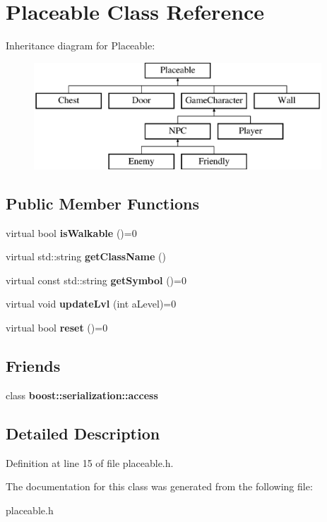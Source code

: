 \hypertarget{class_placeable}{}\section{Placeable Class Reference}
\label{class_placeable}
Inheritance diagram for Placeable\+:\begin{figure}[H]
\begin{center}
\leavevmode
\includegraphics[height=4.000000cm]{class_placeable}
\end{center}
\end{figure}
\subsection*{Public Member Functions}
\begin{DoxyCompactItemize}
\item 
\hypertarget{class_placeable_ac044b1aa2e26da04892ca79ab1082e75}{}\label{class_placeable_ac044b1aa2e26da04892ca79ab1082e75} 
virtual bool {\bfseries is\+Walkable} ()=0
\item 
\hypertarget{class_placeable_afbea2399c9d303b4b0d339cbb85e438b}{}\label{class_placeable_afbea2399c9d303b4b0d339cbb85e438b} 
virtual std\+::string {\bfseries get\+Class\+Name} ()
\item 
\hypertarget{class_placeable_ab8988274bf119aace5083ebbf27ea096}{}\label{class_placeable_ab8988274bf119aace5083ebbf27ea096} 
virtual const std\+::string {\bfseries get\+Symbol} ()=0
\item 
\hypertarget{class_placeable_a415577ef15fc368e9d340d2bc3c01bec}{}\label{class_placeable_a415577ef15fc368e9d340d2bc3c01bec} 
virtual void {\bfseries update\+Lvl} (int a\+Level)=0
\item 
\hypertarget{class_placeable_ae1161133792a3fe4d5f5bc60cfbc3a3f}{}\label{class_placeable_ae1161133792a3fe4d5f5bc60cfbc3a3f} 
virtual bool {\bfseries reset} ()=0
\end{DoxyCompactItemize}
\subsection*{Friends}
\begin{DoxyCompactItemize}
\item 
\hypertarget{class_placeable_ac98d07dd8f7b70e16ccb9a01abf56b9c}{}\label{class_placeable_ac98d07dd8f7b70e16ccb9a01abf56b9c} 
class {\bfseries boost\+::serialization\+::access}
\end{DoxyCompactItemize}


\subsection{Detailed Description}


Definition at line 15 of file placeable.\+h.



The documentation for this class was generated from the following file\+:\begin{DoxyCompactItemize}
\item 
placeable.\+h\end{DoxyCompactItemize}
